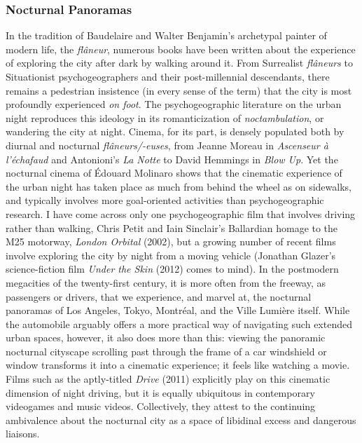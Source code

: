 \documentclass[
  letterpaper,
  DIV=11,
  numbers=noendperiod,
  oneside]{scrartcl}
\begin{document}
\marginnote{\begin{footnotesize}

\end{footnotesize}}

\subsubsection{Nocturnal Panoramas}\label{nocturnal-panoramas}

In the tradition of Baudelaire and Walter Benjamin's archetypal painter
of modern life, the \emph{flâneur}, numerous books have been written
about the experience of exploring the city after dark by walking around
it. From Surrealist \emph{flâneurs} to Situationist psychogeographers
and their post-millennial descendants, there remains a pedestrian
insistence (in every sense of the term) that the city is most profoundly
experienced \emph{on foot}. The psychogeographic literature on the urban
night reproduces this ideology in its romanticization of
\emph{noctambulation}, or wandering the city at night. Cinema, for its
part, is densely populated both by diurnal and nocturnal
\emph{flâneurs/-euses}, from Jeanne Moreau in \emph{Ascenseur à
l'échafaud} and Antonioni's \emph{La Notte} to David Hemmings in
\emph{Blow Up}. Yet the nocturnal cinema of Édouard Molinaro shows that
the cinematic experience of the urban night has taken place as much from
behind the wheel as on sidewalks, and typically involves more
goal-oriented activities than psychogeographic research. I have come
across only one psychogeographic film that involves driving rather than
walking, Chris Petit and Iain Sinclair's Ballardian homage to the M25
motorway, \emph{London Orbital} (2002), but a growing number of recent
films involve exploring the city by night from a moving vehicle
(Jonathan Glazer's science-fiction film \emph{Under the Skin} (2012)
comes to mind). In the postmodern megacities of the twenty-first
century, it is more often from the freeway, as passengers or drivers,
that we experience, and marvel at, the nocturnal panoramas of Los
Angeles, Tokyo, Montréal, and the Ville Lumière itself. While the
automobile arguably offers a more practical way of navigating such
extended urban spaces, however, it also does more than this: viewing the
panoramic nocturnal cityscape scrolling past through the frame of a car
windshield or window transforms it into a cinematic experience; it feels
like watching a movie. Films such as the aptly-titled \emph{Drive}
(2011) explicitly play on this cinematic dimension of night driving, but
it is equally ubiquitous in contemporary videogames and music videos.
Collectively, they attest to the continuing ambivalence about the
nocturnal city as a space of libidinal excess and dangerous liaisons.
\end{document}
